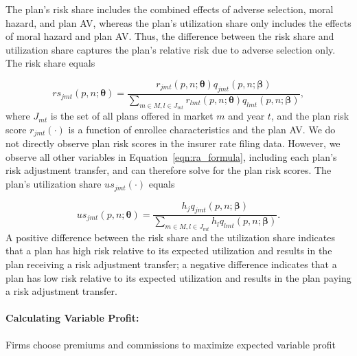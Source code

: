 \documentclass[12pt]{article}
\begin{document}
The plan's risk share includes the combined effects of adverse selection, moral hazard, and plan AV, whereas the plan's utilization share only includes the effects of moral hazard and plan AV. Thus, the difference between the risk share and utilization share captures the plan's relative risk due to adverse selection only. The risk share equals

\vspace{-0.1in}
\begin{equation*}
	rs_{jmt}(\textit{p},\textit{n};\boldsymbol{\theta}) = \frac{ r_{jmt}(\textit{p},\textit{n};\boldsymbol{\theta}) q_{jmt}(\textit{p},\textit{n};\boldsymbol{\beta})}{\sum_{m \in M, l \in J_{mt}}  r_{lmt}(\textit{p},\textit{n};\boldsymbol{\theta}) q_{lmt}(\textit{p},\textit{n};\boldsymbol{\beta})},
\end{equation*}
where $J_{mt}$ is the set of all plans offered in market $m$ and year $t$, and the plan risk score $r_{jmt}(\cdot)$ is a function of enrollee characteristics and the plan AV. We do not directly observe plan risk scores in the insurer rate filing data.  However, we observe all other variables in Equation~\eqref{eqn:ra_formula}, including each plan's risk adjustment transfer, and can therefore solve for the plan risk scores. The plan's utilization share $us_{jmt}(\cdot)$ equals

\vspace{-0.1in}
\begin{equation*}
	us_{jmt}(\textit{p},\textit{n};\boldsymbol{\theta}) =  \frac{ h_j q_{jmt}(\textit{p},\textit{n};\boldsymbol{\beta})}{\sum_{m \in M, l \in J_{mt}} h_l q_{lmt}(\textit{p},\textit{n};\boldsymbol{\beta})}.
\end{equation*}
A positive difference between the risk share and the utilization share indicates that a plan has high risk relative to its expected utilization and results in the plan receiving a risk adjustment transfer; a negative difference indicates that a plan has low risk relative to its expected utilization and results in the plan paying a risk adjustment transfer.

\paragraph{Calculating Variable Profit:} 
Firms choose premiums and commissions to maximize expected variable profit
\end{document}
